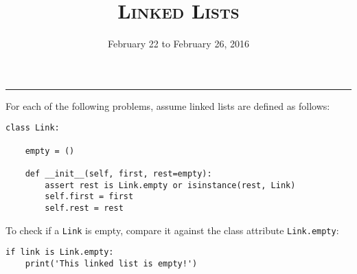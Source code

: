 \documentclass{exam}
\title{\textsc{Linked Lists}}
\date{February 22 to February 26, 2016}
\begin{document}
\maketitle
\rule{\textwidth}{0.15em}
\fontsize{12}{15}\selectfont




\begin{blocksection}
For each of the following problems, assume linked lists are defined as follows:
\newline
\begin{lstlisting}
class Link:

    empty = ()

    def __init__(self, first, rest=empty):
        assert rest is Link.empty or isinstance(rest, Link)
        self.first = first
        self.rest = rest
\end{lstlisting}

To check if a \texttt{Link} is empty, compare it against the class attribute \texttt{Link.empty}:
\newline
\begin{lstlisting}
if link is Link.empty:
    print('This linked list is empty!')
\end{lstlisting}
\end{blocksection}
\end{document}

